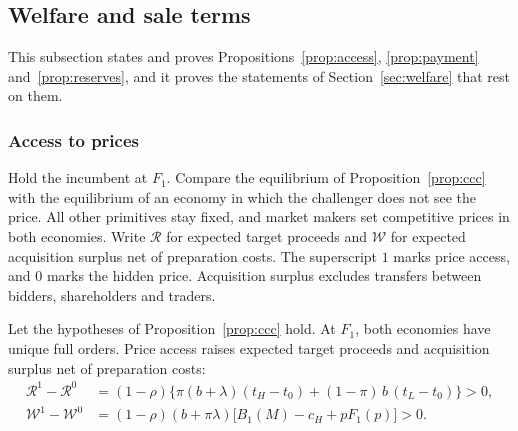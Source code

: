 \subsection{Welfare and sale terms}\label{app:welfare}

This subsection states and proves Propositions~\ref{prop:access}, \ref{prop:payment} and~\ref{prop:reserves}, and
it proves the statements of Section~\ref{sec:welfare} that rest on them.

\subsubsection*{Access to prices}

Hold the incumbent at \(F_1\). Compare the equilibrium of Proposition~\ref{prop:ccc} with the equilibrium of an
economy in which the challenger does not see the price. All other primitives stay fixed, and market makers set
competitive prices in both economies. Write \(\mathcal R\) for expected target proceeds and \(\mathcal W\) for expected
acquisition surplus net of preparation costs. The superscript \(1\) marks price access, and \(0\) marks the hidden
price. Acquisition surplus excludes transfers between bidders, shareholders and traders.

\begin{proposition}\label{prop:access}
Let the hypotheses of Proposition~\ref{prop:ccc} hold. At \(F_1\), both economies have unique full orders. Price
access raises expected target proceeds and acquisition surplus net of preparation costs:
\[
\begin{aligned}
\mathcal R^1-\mathcal R^0&=(1-\rho)\bigl\{\pi(b+\lambda)(t_H-t_0)+(1-\pi)\,b\,(t_L-t_0)\bigr\}>0,\\
\mathcal W^1-\mathcal W^0&=(1-\rho)(b+\pi\lambda)\bigl[B_1(M)-c_H+pF_1(p)\bigr]>0.
\end{aligned}
\]
\end{proposition}

